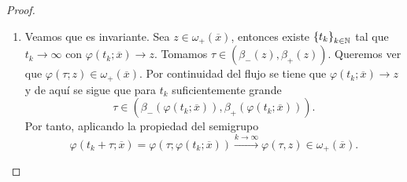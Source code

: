\begin{proof}
\begin{enumerate}
\begin{itemize}
		Análogamente, existe $\displaystyle \left\{ \tau_{k}\right\} _{k \in \N} $ con $\displaystyle \tau_{k}\to \infty $ tal que $\displaystyle \varphi\left(\tau_{k}; \overline{x}\right)\to z_{V}\in V \cap \omega_{+}\left(\overline{x}\right) $, con $\displaystyle \left\{ \varphi\left(\tau_{k}; \overline{x}\right)\right\} _{k \in\N}\subset V $. 
	Sin pérdida de generalidad podemos suponer que las sucesiones $\displaystyle t_{k} < \tau_{k} < t_{k+1} $ están ordenadas de esta forma. 
	Como $\displaystyle \varphi\left(t_{k}; \overline{x}\right)\in U $ y $\displaystyle \varphi\left(\tau_{k}; \overline{x}\right)\in V $, por continuidad tenemos que existe $\displaystyle T_{k}\in \left(t_{k}, \tau_{k}\right) $ tal que $\displaystyle \varphi\left(T_{k}; \overline{x}\right)\not\in U \cup V $. Así, la sucesión $\displaystyle \left\{ \varphi\left(T_{k}; \overline{x}\right)\right\} _{k \in \N}\subset\gamma^{+}_{\overline{x}}\subset K $, por lo que 
	$\displaystyle \varphi\left(T_{k}; \overline{x}\right)\in K \backslash \left(U \cup V\right) $, que es compacto. Así, existe una subsucesión $\displaystyle \left\{ \varphi\left(T_{k_{j}}; \overline{x}\right)\right\} \to z_{\infty}\in K \backslash \left(U \cup V\right) $. Pero entonces $\displaystyle z_{\infty}\in \omega_{+}\left(\overline{x}\right)\backslash\left(U \cup V\right) $ que es una contradicción. 
	\end{itemize}
\item Veamos que es invariante. Sea $\displaystyle z \in \omega_{+}\left(\overline{x}\right) $, entonces existe $\displaystyle \left\{ t_{k}\right\} _{k\in\mathbb{N}} $ tal que $\displaystyle t_{k}\to \infty $ con $\displaystyle \varphi\left(t_{k}; \overline{x}\right)\to z $. Tomamos $\displaystyle \tau\in \left(\beta_{-}\left(z\right), \beta_{+}\left(z\right)\right) $. 
	Queremos ver que $\displaystyle \varphi\left(\tau; z\right)\in \omega_{+}\left(\overline{x}\right) $. Por continuidad del flujo se tiene que $\displaystyle \varphi\left(t_{k}; \overline{x}\right)\to z $ y de aquí se sigue que para $\displaystyle t_{k} $ suficientemente grande 
	\[\tau\in \left(\beta_{-}\left(\varphi\left(t_{k}; \overline{x}\right)\right), \beta_{+}\left(\varphi\left(t_{k}; \overline{x}\right)\right)\right) .\]
	Por tanto, aplicando la propiedad del semigrupo
	\[\varphi\left(t_{k}+\tau; \overline{x}\right)=\varphi\left(\tau; \varphi\left(t_{k}; \overline{x}\right)\right)\xrightarrow{k \to \infty} \varphi\left(\tau, z\right) \in \omega_{+}\left(\overline{x}\right)	.\]
\end{enumerate}
\end{proof}

